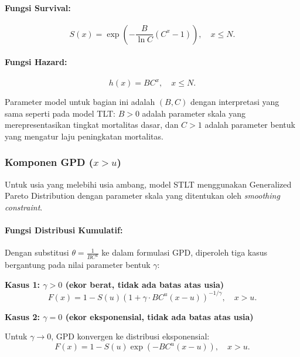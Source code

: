 \paragraph{Fungsi Survival:}
\begin{equation}
S(x) = \exp\left(-\frac{B}{\ln C}(C^x - 1)\right), \quad x \leq N.
\label{eq:stlt_gompertz_survival}
\end{equation}

\paragraph{Fungsi Hazard:}
\begin{equation}
h(x) = BC^x, \quad x \leq N.
\label{eq:stlt_gompertz_hazard}
\end{equation}

Parameter model untuk bagian ini adalah $(B, C)$ dengan interpretasi yang sama seperti pada model TLT: $B > 0$ adalah parameter skala yang merepresentasikan tingkat mortalitas dasar, dan $C > 1$ adalah parameter bentuk yang mengatur laju peningkatan mortalitas.

\subsubsection{Komponen GPD ($x > u$)}

Untuk usia yang melebihi usia ambang, model STLT menggunakan Generalized Pareto Distribution dengan parameter skala yang ditentukan oleh \textit{smoothing constraint}.

\paragraph{Fungsi Distribusi Kumulatif:}

Dengan substitusi $\theta = \frac{1}{BC^u}$ ke dalam formulasi GPD, diperoleh tiga kasus bergantung pada nilai parameter bentuk $\gamma$:

\textbf{Kasus 1: $\gamma > 0$ (ekor berat, tidak ada batas atas usia)}
\begin{equation}
F(x) = 1 - S(u) \left(1 + \gamma \cdot BC^u(x-u)\right)^{-1/\gamma}, \quad x > u.
\label{eq:stlt_gpd_cdf_positive}
\end{equation}

\textbf{Kasus 2: $\gamma = 0$ (ekor eksponensial, tidak ada batas atas usia)}

Untuk $\gamma \to 0$, GPD konvergen ke distribusi eksponensial:
\begin{equation}
F(x) = 1 - S(u) \exp\left(-BC^u(x-u)\right), \quad x > u.
\label{eq:stlt_gpd_cdf_zero}
\end{equation}

